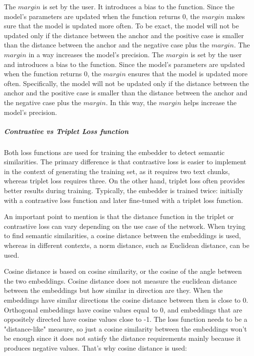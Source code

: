 \documentclass{wseas}
\begin{document}
The \(margin\) is set by the user. It introduces a bias to the function. Since the model's parameters 
are updated when the function returns 0, the \(margin\) makes sure that the model is updated more often. 
To be exact, the model will not be updated only if the distance between the anchor and the positive case is smaller
than the distance between the anchor and the negative case plus the \(margin\). The \(margin\) in a way
increases the model's precision.
The \(margin\) is set by the user and introduces a bias to the function. Since the model's
parameters are updated when the function returns 0, the \(margin\) ensures that the model
is updated more often. Specifically, the model will not be updated only if the distance
between the anchor and the positive case is smaller than the distance between the 
anchor and the negative case plus the \(margin\). In this way, the \(margin\) helps
increase the model's precision.

\subparagraph{Contrastive vs Triplet Loss function}

Both loss functions are used for training the embedder to detect 
semantic similarities. The primary difference is that contrastive loss is easier
to implement in the context of generating the training set, as it requires
two text chunks, whereas triplet loss requires three. On the other hand, triplet
loss often provides better results during training. Typically, the embedder is trained 
twice: initially with a contrastive loss function and later fine-tuned
with a triplet loss function.

An important point to mention is that the distance function in the
triplet or contrastive loss can vary depending on the use case of the
network. When trying to find semantic similarities, a cosine distance
between the embeddings is used, whereas in different contexts, a norm
distance, such as Euclidean distance, can be used.

Cosine distance is based on cosine similarity, or the cosine of the
angle between the two embeddings. Cosine distance does not measure the
euclidean distance between the embeddings but how similar in
direction are they. When the embeddings have similar directions the cosine distance
between then is close to 0. Orthogonal embeddings have cosine values equal to 0, 
and embeddings that are oppositely directed have cosine values close to -1. The loss
function needs to be a "distance-like" measure, so just a cosine similarity
between the embeddings won't be enough since it does not satisfy the
distance requirements mainly because it produces negative values. That's why 
cosine distance is used:
\end{document}
